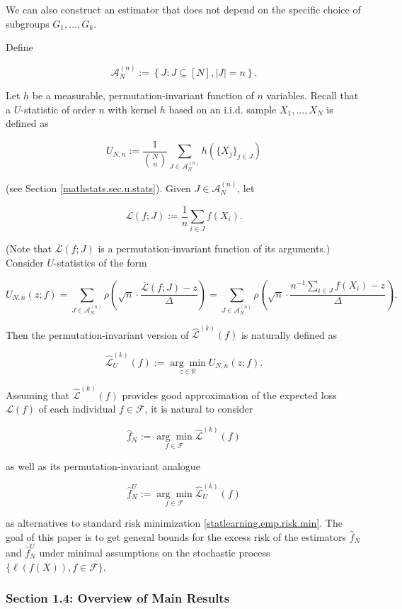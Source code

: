 We can also construct an estimator that does not depend on the specific choice of subgroups \(G_1, \ldots, G_k\).

\begin{definition}

Define

\[
\mathcal{A}_N^{(n)} := \left\{ J: J \subseteq [N], |J| = n \right\}.
\]

Let \(h\) be a measurable, permutation-invariant function of \(n\) variables. Recall that a \(U\)-statistic of order \(n\) with kernel \(h\) based on an i.i.d. sample \(X_1,\ldots, X_N\) is defined as 

\[
U_{N, n} := \frac{1}{\binom{N}{n}} \sum_{J \in \mathcal{A}_N^{(n)} } h \left( \{X_j\}_{j \in J} \right)
\]

(see Section \ref{mathstats.sec.u.stats}). Given \(J \in \mathcal{A}_N^{(n)} \), let 

\[
\overline{\mathcal{L}}(f; J) := \frac{1}{n} \sum_{i \in J} f(X_i).
\]

 (Note that \(\overline{\mathcal{L}}(f; J) \) is a permutation-invariant function of its arguments.) Consider \(U\)-statistics of the form

\[
U_{N, n} (z; f) = \sum_{J \in \mathcal{A}_N^{(n)} } \rho\left( \sqrt{n} \cdot \frac{\overline{\mathcal{L}}(f; J)  -z}{\Delta} \right) = \sum_{J \in \mathcal{A}_N^{(n)} } \rho\left( \sqrt{n} \cdot \frac{n^{-1}  \sum_{i \in J} f(X_i)  -z}{\Delta} \right).
\]

Then the permutation-invariant version of \(\hat{\mathcal{L}}^{(k)}(f)\) is naturally defined as

\[
\hat{\mathcal{L}}_U^{(k)}(f) := \underset{z \in \mathbb{R}}{\arg \min} U_{N, n}(z; f).
\]



\end{definition}

Assuming that \(\hat{\mathcal{L}}^{(k)}(f)\) provides good approximation of the expected loss \(\mathcal{L}(f)\) of each individual \(f \in \mathcal{F}\), it is natural to consider 

\[
\hat{f}_N := \underset{f \in \mathcal{F}}{\arg \min} \hat{\mathcal{L}}^{(k)}(f) 
\]

as well as its permutation-invariant analogue

\[
\hat{f}_N^U := \underset{f \in \mathcal{F}}{\arg \min} \hat{\mathcal{L}}_U^{(k)}(f) 
\]

as alternatives to standard risk minimization \eqref{statlearning.emp.risk.min}. The goal of this paper is to get general bounds for the excess risk of the estimators \(\hat{f}_N\) and \(\hat{f}_N^U\) under minimal assumptions on the stochastic process \(\{\ell(f(X)), f \in \mathcal{F}\}\).

\subsubsection{Section 1.4: Overview of Main Results}

%
%
%
%
%
%
%
%
%

%
%
%
